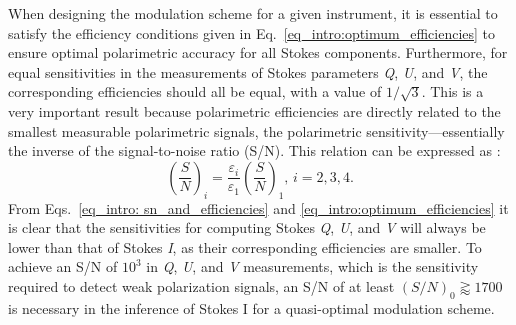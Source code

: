 When designing the modulation scheme for a given instrument, it is essential to satisfy the efficiency conditions given in Eq.~\eqref{eq_intro:optimum_efficiencies} to ensure optimal polarimetric accuracy for all Stokes components. Furthermore, for equal sensitivities in the measurements of Stokes parameters \textit{Q}, \textit{U}, and \textit{V}, the corresponding efficiencies should all be equal, with a value of $1/\sqrt{3}$. This is a very important result because polarimetric efficiencies are directly related to the smallest measurable polarimetric signals, the polarimetric sensitivity—essentially the inverse of the signal-to-noise ratio (S/N). This relation can be expressed as \citep{optimum_modulation}:
\begin{equation}
  \left( \frac{S}{N}\right)_i = \frac{\varepsilon _ i}{\varepsilon _ 1} \left(\frac{S}{N}\right)_1 \text{,    } i = 2, 3, 4 .
  \label{eq_intro: sn_and_efficiencies}
\end{equation}
From Eqs.~\eqref{eq_intro: sn_and_efficiencies} and \eqref{eq_intro:optimum_efficiencies} it is clear that the sensitivities for computing Stokes \textit{Q}, \textit{U}, and \textit{V} will always be lower than that of Stokes \textit{I}, as their corresponding efficiencies are smaller. To achieve an S/N of $10^3$ in \textit{Q}, \textit{U}, and \textit{V} measurements, which is the sensitivity required to detect weak polarization signals, an S/N of at least $ \left(S/N \right)_0 \gtrapprox 1700$ is necessary in the inference of Stokes I for a quasi-optimal modulation scheme.

